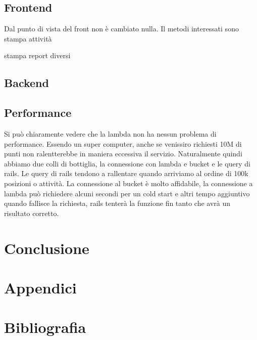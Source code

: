 \documentclass[12pt]{article}
\begin{document}
\subsection{Frontend}
Dal punto di vista del front non è cambiato nulla. Il metodi interessati sono
stampa attività 

stampa report diversi 
\subsection{Backend}

\subsection{Performance}
Si può chiaramente vedere che la lambda non ha nessun problema di performance.
Essendo un super computer, anche se venissiro richiesti 10M di punti non ralentterebbe 
in maniera eccessiva il servizio. 
Naturalmente quindi abbiamo due colli di bottiglia, la connessione con lambda e 
bucket e le query di rails. Le query di rails tendono a rallentare quando arriviamo 
al ordine di 100k posizioni o attività. 
La connessione al bucket è molto affidabile, la connessione a lambda può richiedere 
alcuni secondi per un cold start e altri tempo aggiuntivo quando fallisce la richiesta, 
rails tenterà la funzione fin tanto che avrà un risultato corretto. 
\section{Conclusione}
\section{Appendici}
\section{Bibliografia}
\end{document}
